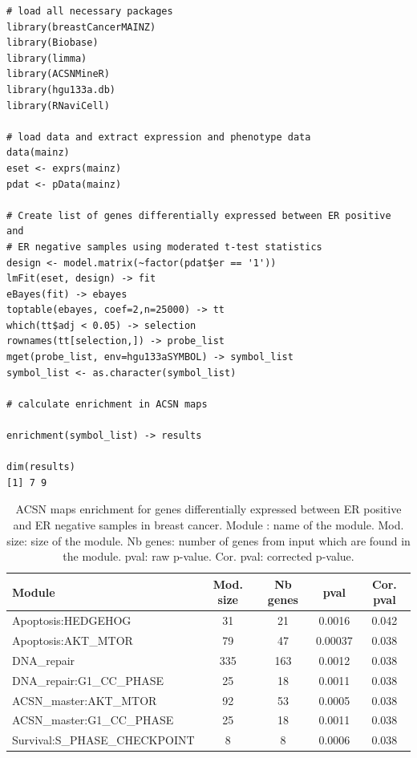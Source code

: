 \documentclass[article]{jss}
\begin{document}
\begin{verbatim}
# load all necessary packages
library(breastCancerMAINZ)
library(Biobase)
library(limma)
library(ACSNMineR)
library(hgu133a.db)
library(RNaviCell)

# load data and extract expression and phenotype data 
data(mainz)
eset <- exprs(mainz)
pdat <- pData(mainz)

# Create list of genes differentially expressed between ER positive and 
# ER negative samples using moderated t-test statistics 
design <- model.matrix(~factor(pdat$er == '1'))
lmFit(eset, design) -> fit
eBayes(fit) -> ebayes
toptable(ebayes, coef=2,n=25000) -> tt
which(tt$adj < 0.05) -> selection
rownames(tt[selection,]) -> probe_list
mget(probe_list, env=hgu133aSYMBOL) -> symbol_list
symbol_list <- as.character(symbol_list)

# calculate enrichment in ACSN maps 

enrichment(symbol_list) -> results

dim(results)
[1] 7 9
\end{verbatim}

\begin{table}[h!]
  \centering
  \caption{ACSN maps enrichment for genes differentially expressed between ER
positive and ER negative samples in breast cancer.  Module : name of the
module. Mod. size: size of the module. Nb genes: number of genes from input
which are found in the module. pval: raw p-value. Cor. pval: corrected p-value.}
\label{tab:table_mainz}

\begin{tabular}{l|c|c|c|c}
\hline
Module & Mod. size & Nb genes & pval & Cor. pval\\
\hline
Apoptosis:HEDGEHOG & 31 & 21 & 0.0016 & 0.042 \\
Apoptosis:AKT\_MTOR &  79 & 47 & 0.00037 & 0.038 \\
DNA\_repair & 335 & 163 & 0.0012 & 0.038 \\
DNA\_repair:G1\_CC\_PHASE &  25 & 18 & 0.0011 & 0.038 \\
ACSN\_master:AKT\_MTOR & 92 & 53 & 0.0005 & 0.038 \\
ACSN\_master:G1\_CC\_PHASE & 25 & 18 & 0.0011 & 0.038 \\
Survival:S\_PHASE\_CHECKPOINT & 8 & 8 & 0.0006 & 0.038 \\
\hline
\end{tabular}
\end{table}
\end{document}

